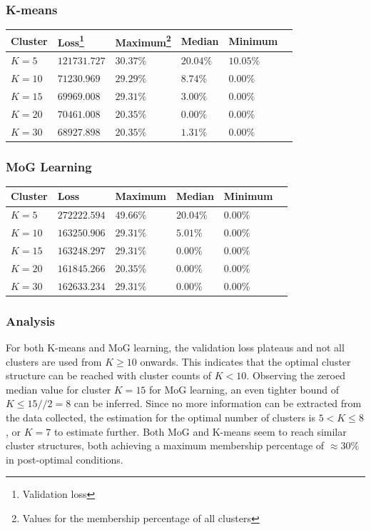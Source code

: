 \documentclass[letterpaper]{article}
\begin{document}
\subsubsection{K-means}

\begin{tabularx}{\textwidth}{X|XXXXX}
 \toprule
 Cluster & Loss\footnote{Validation loss} & Maximum\footnote{Values for the membership percentage of all clusters} & Median & Minimum \\
 \midrule
 $K = 5$ & $121731.727$ & $30.37\%$ & $20.04\%$ & $10.05\%$ \\
 $K = 10$ & $71230.969$ & $29.29\%$ & $8.74\%$ & $0.00\%$ \\
 $K = 15$ & $69969.008$ & $29.31\%$ & $3.00\%$ & $0.00\%$ \\
 $K = 20$ & $70461.008$ & $20.35\%$ & $0.00\%$ & $0.00\%$ \\
 $K = 30$ & $68927.898$ & $20.35\%$ & $1.31\%$ & $0.00\%$ \\
 \bottomrule
\end{tabularx}

\subsubsection{MoG Learning}

\begin{tabularx}{\textwidth}{X|XXXXX}
 \toprule
 Cluster & Loss & Maximum & Median & Minimum \\
 \midrule
 $K = 5$ & $272222.594$ & $49.66\%$ & $20.04\%$ & $0.00\%$ \\
 $K = 10$ & $163250.906$ & $29.31\%$ & $5.01\%$ & $0.00\%$ \\
 $K = 15$ & $163248.297$ & $29.31\%$ & $0.00\%$ & $0.00\%$ \\
 $K = 20$ & $161845.266$ & $20.35\%$ & $0.00\%$ & $0.00\%$ \\
 $K = 30$ & $162633.234$ & $29.31\%$ & $0.00\%$ & $0.00\%$ \\
 \bottomrule
\end{tabularx}

\subsubsection{Analysis}

For both K-means and MoG learning, the validation loss plateaus and not all clusters are used from $K \ge 10$ onwards. This indicates that the optimal cluster structure can be reached with cluster counts of $K < 10$. Observing the zeroed median value for cluster $K = 15$ for MoG learning, an even tighter bound of $K \le 15 // 2 = 8$ can be inferred. Since no more information can be extracted from the data collected, the estimation for the optimal number of clusters is $5 < K \le 8$, or $K = 7$ to estimate further. Both MoG and K-means seem to reach similar cluster structures, both achieving a maximum membership percentage of $\approx 30\%$ in post-optimal conditions. 
\end{document}
